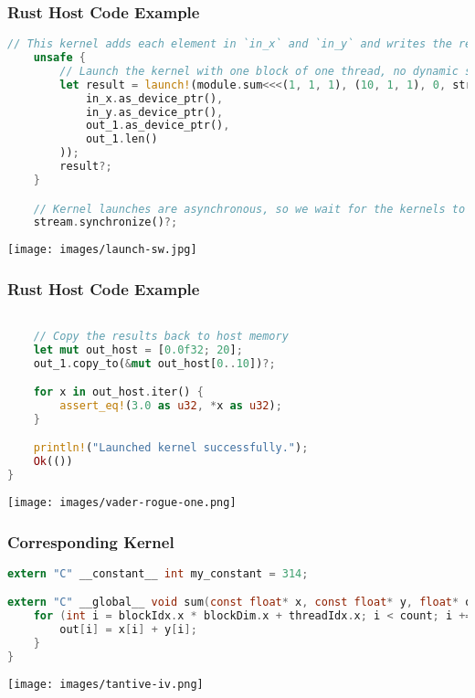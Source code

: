 \begin{frame}[fragile]
\frametitle{Rust Host Code Example}
\begin{lstlisting}[language=Rust]
    // This kernel adds each element in `in_x` and `in_y` and writes the result into `out`.
    unsafe {
        // Launch the kernel with one block of one thread, no dynamic shared memory on `stream`.
        let result = launch!(module.sum<<<(1, 1, 1), (10, 1, 1), 0, stream>>>(
            in_x.as_device_ptr(),
            in_y.as_device_ptr(),
            out_1.as_device_ptr(),
            out_1.len()
        ));
        result?;
    }

    // Kernel launches are asynchronous, so we wait for the kernels to finish executing.
    stream.synchronize()?;
\end{lstlisting}

\begin{center}
	\texttt{[image: images/launch-sw.jpg]}
\end{center}

\end{frame}


\begin{frame}[fragile]
\frametitle{Rust Host Code Example}
\begin{lstlisting}[language=Rust]

    // Copy the results back to host memory
    let mut out_host = [0.0f32; 20];
    out_1.copy_to(&mut out_host[0..10])?;

    for x in out_host.iter() {
        assert_eq!(3.0 as u32, *x as u32);
    }

    println!("Launched kernel successfully.");
    Ok(())
}
\end{lstlisting}
\vspace{-1em}
\begin{center}
	\texttt{[image: images/vader-rogue-one.png]}
\end{center}

\end{frame}


\begin{frame}[fragile]
\frametitle{Corresponding Kernel}

\begin{lstlisting}[language=C]
extern "C" __constant__ int my_constant = 314;

extern "C" __global__ void sum(const float* x, const float* y, float* out, int count) {
    for (int i = blockIdx.x * blockDim.x + threadIdx.x; i < count; i += blockDim.x * gridDim.x) {
        out[i] = x[i] + y[i];
    }
}
\end{lstlisting}


\begin{center}
	\texttt{[image: images/tantive-iv.png]}
\end{center}
\end{frame}

